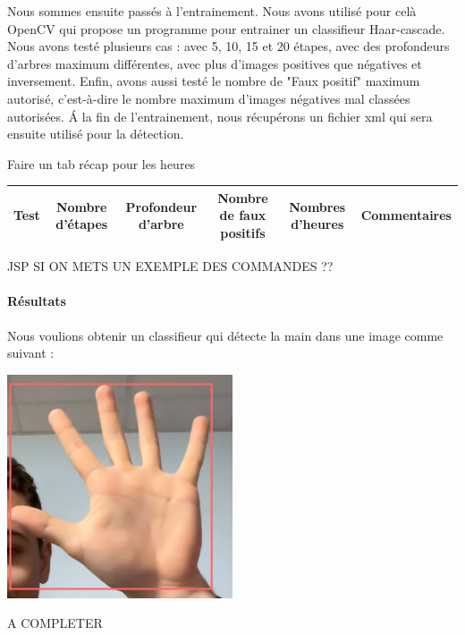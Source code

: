 \documentclass[11pt]{article}
\begin{document}
Nous sommes ensuite passés à l'entrainement. Nous avons utilisé pour celà OpenCV qui propose un programme pour entrainer un classifieur Haar-cascade. Nous avons testé plusieurs cas : avec 5, 10, 15 et 20 étapes, avec des profondeurs d'arbres maximum différentes, avec plus d'images positives que négatives et inversement. Enfin, avons aussi testé le nombre de "Faux positif" maximum autorisé, c'est-à-dire le nombre maximum d'images négatives mal classées autorisées. \'A la fin de l'entrainement, nous récupérons un fichier xml qui sera ensuite utilisé pour la détection.\bigbreak

{\LARGE Faire un tab récap pour les heures}  \bigbreak

\noindent \begin{tabular}{|c|c|c|c|c|c|}
    \hline
    Test & Nombre d'étapes & Profondeur d'arbre & Nombre de faux positifs & Nombres d'heures & Commentaires \\
    \hline    
\end{tabular}

\bigbreak
{\LARGE JSP SI ON METS UN EXEMPLE DES COMMANDES ??}

\paragraph{Résultats}
Nous voulions obtenir un classifieur qui détecte la main dans une image comme suivant : 
\begin{center}
    \includegraphics[width=0.5\textwidth]{images/res_attendu.png}
\end{center}

{\LARGE A COMPLETER}
\end{document}
